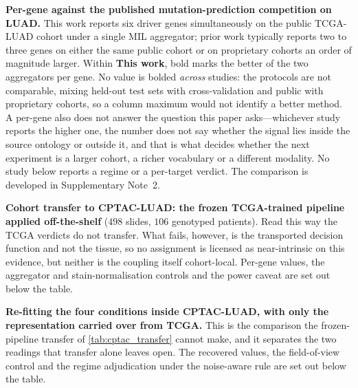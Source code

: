\begin{table}[htbp]
\centering

\caption{\textbf{Per-gene \auroc{} against the published
mutation-prediction competition on LUAD.} This work reports six driver
genes simultaneously on the public TCGA-LUAD cohort under a single MIL
aggregator; prior work typically reports two to three genes on either the
same public cohort or on proprietary cohorts an order of magnitude larger.
Within \textbf{This work}, bold marks the better of the two aggregators
per gene. No value is bolded \emph{across} studies: the protocols are not
comparable, mixing held-out test sets with cross-validation and public
with proprietary cohorts, so a column maximum would not identify a better
method. A per-gene \auroc{} also does not answer the question this paper
asks---whichever study reports the higher one, the number does not say
whether the signal lies inside the source ontology or outside it, and
that is what decides whether the next experiment is a larger cohort, a
richer vocabulary or a different modality. No study below reports a regime
or a per-target verdict. The comparison is developed in Supplementary
Note~2.}
\label{tab:literature_comparison}
\end{table}

\begin{table}[htbp]
\centering

\caption{\textbf{Cohort transfer to CPTAC-LUAD: the frozen TCGA-trained
pipeline applied off-the-shelf} ($498$ slides, $106$ genotyped patients).
Read this way the TCGA verdicts do not transfer. What fails, however, is
the transported decision function and not the tissue, so no assignment is
licensed as near-intrinsic on this evidence, but neither is the coupling
itself cohort-local. Per-gene values, the aggregator and
stain-normalisation controls and the power caveat are set out below the
table.}
\label{tab:cptac_transfer}
\end{table}

\begin{table}[htbp]
\centering

\caption{\textbf{Re-fitting the four conditions inside CPTAC-LUAD, with
only the representation carried over from TCGA.} This is the comparison
the frozen-pipeline transfer of \cref{tab:cptac_transfer} cannot make, and it
separates the two readings that transfer alone leaves open. The recovered
values, the field-of-view control and the regime adjudication under the
noise-aware rule are set out below the table.}
\label{tab:cptac_refit}
\end{table}

